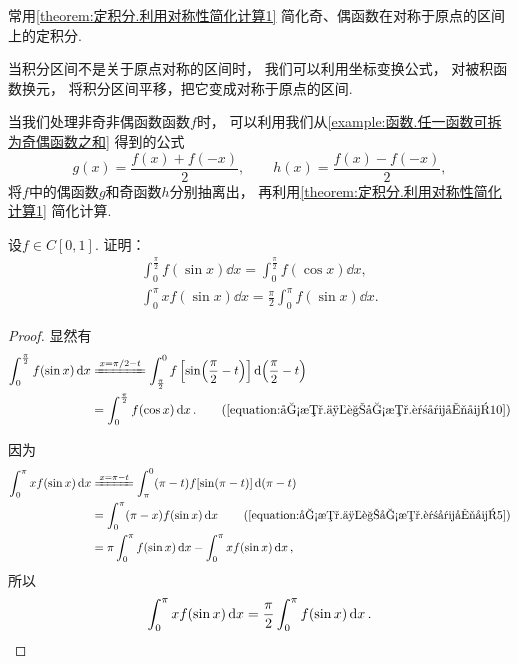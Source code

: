 \begin{remark}
常用\cref{theorem:定积分.利用对称性简化计算1} 简化奇、偶函数在对称于原点的区间上的定积分.

当积分区间不是关于原点对称的区间时，
我们可以利用坐标变换公式，
对被积函数换元，
将积分区间平移，把它变成对称于原点的区间.

当我们处理非奇非偶函数函数\(f\)时，
可以利用我们从\cref{example:函数.任一函数可拆为奇偶函数之和} 得到的公式\[
	g(x) = \frac{f(x) + f(-x)}{2}, \qquad
	h(x) = \frac{f(x) - f(-x)}{2},
\]
将\(f\)中的偶函数\(g\)和奇函数\(h\)分别抽离出，
再利用\cref{theorem:定积分.利用对称性简化计算1} 简化计算.
\end{remark}

\begin{example}
设\(f \in C[0,1]\).
证明：\begin{gather}
	\int_0^{\frac\pi2} f(\sin x) \dd{x}
	= \int_0^{\frac\pi2} f(\cos x) \dd{x}, \\
	\int_0^\pi x f(\sin x) \dd{x}
	= \frac{\pi}{2} \int_0^\pi f(\sin x) \dd{x}.
\end{gather}
\begin{proof}
显然有\begin{align*}
	\int_0^{\frac\pi2} f(\sin x) \dd{x}
	&\xlongequal{x = \pi/2-t}
		\int_{\frac\pi2}^0 f\left[\sin(\frac{\pi}{2}-t)\right] \dd(\frac{\pi}{2}-t) \\
	&= \int_0^{\frac\pi2} f(\cos x) \dd{x}.
		\tag{\cref{equation:函数.三角函数.诱导公式10}}
\end{align*}

因为\begin{align*}
	\int_0^\pi x f(\sin x) \dd{x}
	&\xlongequal{x = \pi-t}
		\int_{\pi}^0 (\pi-t) f[\sin(\pi-t)] \dd(\pi-t) \\
	&= \int_0^\pi (\pi-x) f(\sin x) \dd{x}
		\tag{\cref{equation:函数.三角函数.诱导公式5}} \\
	&= \pi \int_0^\pi f(\sin x) \dd{x}
		- \int_0^\pi x f(\sin x) \dd{x},
\end{align*}
所以\[
	\int_0^\pi x f(\sin x) \dd{x}
	= \frac{\pi}{2} \int_0^\pi f(\sin x) \dd{x}.
	\qedhere
\]
\end{proof}
\end{example}

